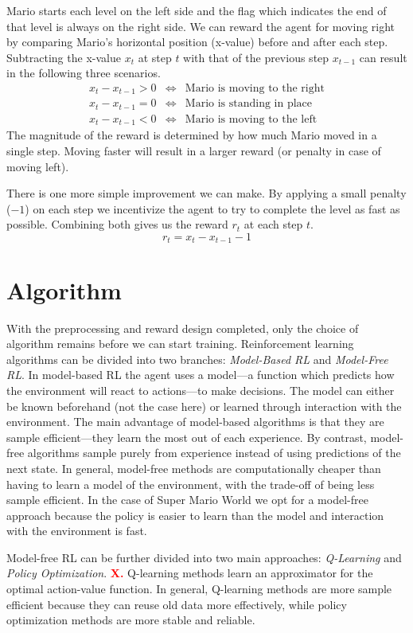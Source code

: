 \documentclass[a4paper]{article}
\begin{document}
Mario starts each level on the left side and the flag which indicates the end of that level is always on the right side.
We can reward the agent for moving right by comparing Mario's horizontal position (x-value) before and after each step.
Subtracting the x-value $x_{t}$ at step $t$ with that of the previous step $x_{t-1}$ can result in the following three scenarios.
\begin{eqnarray*}
    x_{t} - x_{t-1} > 0&\iff&\text{Mario is moving to the right}\\
    x_{t} - x_{t-1} = 0&\iff&\text{Mario is standing in place}\\
    x_{t} - x_{t-1} < 0&\iff&\text{Mario is moving to the left}
\end{eqnarray*}
The magnitude of the reward is determined by how much Mario moved in a single step.
Moving faster will result in a larger reward (or penalty in case of moving left).

There is one more simple improvement we can make.
By applying a small penalty ($-1$) on each step we incentivize the agent to try to complete the level as fast as possible.
Combining both gives us the reward $r_{t}$ at each step $t$.
\[r_{t} = x_{t} - x_{t-1} - 1\]


\section{Algorithm} \label{s:algorithm}
With the preprocessing and reward design completed, only the choice of algorithm remains before we can start training.
Reinforcement learning algorithms can be divided into two branches: \emph{Model-Based RL} and \emph{Model-Free RL}.
In model-based RL the agent uses a model---a function which predicts how the environment will react to actions---to make decisions.
The model can either be known beforehand (not the case here) or learned through interaction with the environment.
The main advantage of model-based algorithms is that they are sample efficient---they learn the most out of each experience.
By contrast, model-free algorithms sample purely from experience instead of using predictions of the next state.
In general, model-free methods are computationally cheaper than having to learn a model of the environment, with the trade-off of being less sample efficient.
In the case of Super Mario World we opt for a model-free approach because the policy is easier to learn than the model and interaction with the environment is fast.

Model-free RL can be further divided into two main approaches: \emph{Q-Learning} and \emph{Policy Optimization}.
\textbf{\textcolor{red}{X.}}
Q-learning methods learn an approximator for the optimal action-value function.
In general, Q-learning methods are more sample efficient because they can reuse old data more effectively, while policy optimization methods are more stable and reliable.
\end{document}
